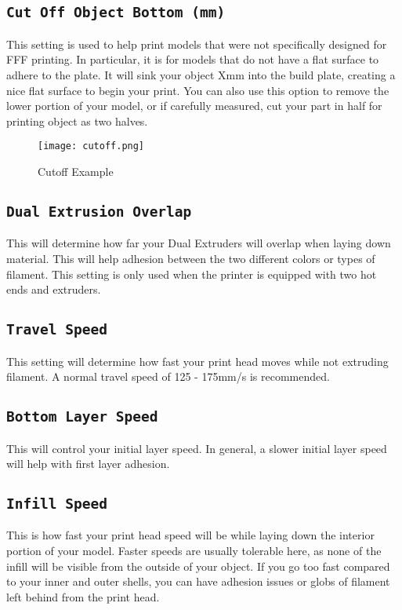 \subsection{\texttt{Cut Off Object Bottom (mm)}}
This setting is used to help print models that were not specifically designed for FFF printing. In particular, it is for models that do not have a flat surface to adhere to the plate. It will sink your object Xmm into the build plate, creating a nice flat surface to begin your print. You can also use this option to remove the lower portion of your model, or if carefully measured, cut your part in half for printing object as two halves.
\begin{figure}[H]
\centering
\texttt{[image: cutoff.png]}
\caption{Cutoff Example}
\label{fig:Cutoff Example}
\end{figure}

\subsection{\texttt{Dual Extrusion Overlap}}
This will determine how far your Dual Extruders will overlap when laying down material. This will help adhesion between the two different colors or types of filament. This setting is only used when the printer is equipped with two hot ends and extruders.

\subsection{\texttt{Travel Speed}}
This setting will determine how fast your print head moves while not extruding filament. A normal travel speed of 125 - 175mm/s is recommended.

\subsection{\texttt{Bottom Layer Speed}}
This will control your initial layer speed. In general, a slower initial layer speed will help with first layer adhesion. 

\subsection{\texttt{Infill Speed}}
This is how fast your print head speed will be while laying down the interior portion of your model. Faster speeds are usually tolerable here, as none of the infill will be visible from the outside of your object. If you go too fast compared to your inner and outer shells, you can have adhesion issues or globs of filament left behind from the print head.

